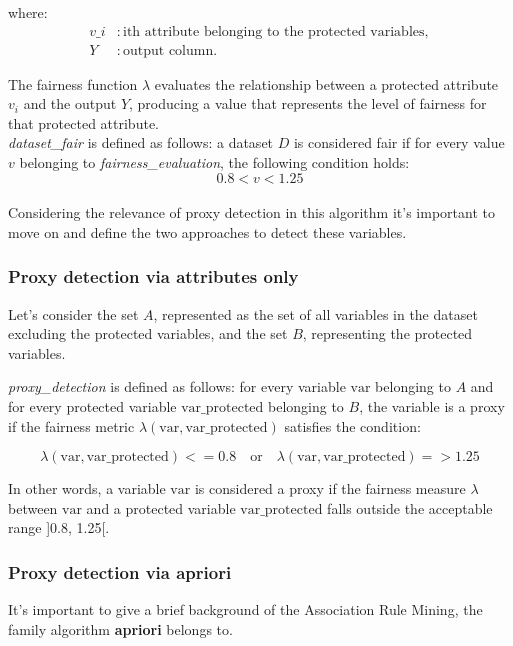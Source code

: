 \documentclass[12pt,a4paper,openright,twoside]{book}
\begin{document}
where:
\begin{align*}
v\_i & : \text{ith attribute belonging to the protected variables}, \\
Y & : \text{output column}.
\end{align*}

The fairness function \( \lambda \) evaluates the relationship between a protected attribute \( v_i \) and the output \( Y \), producing a value that represents the level of fairness for that protected attribute. \\

\textit{dataset\_fair} is defined as follows: a dataset \( D \) is considered fair if for every value \( v \) belonging to \textit{fairness\_evaluation}, the following condition holds:
\[ 0.8  < v < 1.25 \] \\

Considering the relevance of proxy detection in this algorithm it's important to move on and define the two approaches to detect these variables. \\

\subsubsection{Proxy detection via attributes only}
Let's consider the set \( A \), represented as the set of all variables in the dataset excluding the protected variables, and the set \( B \), representing the protected variables.

\textit{proxy\_detection} is defined as follows: for every variable \( \text{var} \) belonging to \( A \) and for every protected variable \( \text{var\_protected} \) belonging to \( B \), the variable is a proxy if the fairness metric \( \lambda(\text{var}, \text{var\_protected}) \) satisfies the condition:

\[
\lambda(\text{var}, \text{var\_protected}) <= 0.8 \quad \text{or} \quad \lambda(\text{var}, \text{var\_protected}) => 1.25
\]

In other words, a variable \( \text{var} \) is considered a proxy if the fairness measure \( \lambda \) between \( \text{var} \) and a protected variable \( \text{var\_protected} \) falls outside the acceptable range ]0.8, 1.25[. \\

\subsubsection{Proxy detection via apriori}
It's important to give a brief background of the Association Rule Mining, the family algorithm \textbf{apriori} belongs to.
\end{document}
